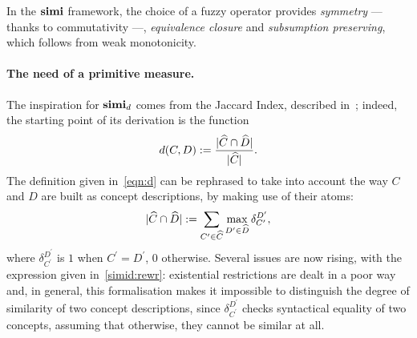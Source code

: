 In the \(\mathbf{simi}{}\) framework, the choice of a fuzzy operator provides \emph{symmetry} --- thanks to commutativity ---, \emph{equivalence closure} and \emph{subsumption preserving}, which follows from weak monotonicity.

\paragraph{The need of a primitive measure.}
The inspiration for \(\mathbf{simi}_d\) comes from the Jaccard Index, described in~\cite{Ja01};
indeed, the starting point of its derivation is the function
\begin{equation}
  \label{eqn:d}
  d(C,D) :=
\frac{\lvert \widehat{C} \cap \widehat{D} \rvert}{\lvert \widehat{C} \rvert}.
\end{equation}
The definition given in~\eqref{eqn:d} can be rephrased to take into account the way \(C\) and \(D\) are built as concept descriptions, by making use of their atoms:
\begin{equation}
  \label{simid:rewr}
  \lvert \widehat{C} \cap \widehat{D} \rvert := \sum_{C^\prime \in \widehat{C}}\max_{D^\prime \in \widehat{D}}
                                  \delta_{C^\prime}^{D^\prime},
\end{equation}
where \(\delta_{C^\prime}^{D^\prime}\) is \(1\) when \(C^\prime = D^\prime\), \(0\) otherwise.
Several issues are now rising, with the expression given in~\eqref{simid:rewr}:
existential restrictions are dealt in a poor way and, in general, this formalisation makes it impossible to distinguish the degree of similarity of two concept descriptions, since \(\delta_{C^\prime}^{D^\prime}\) checks syntactical equality of two concepts, assuming that otherwise, they cannot be similar at all.

